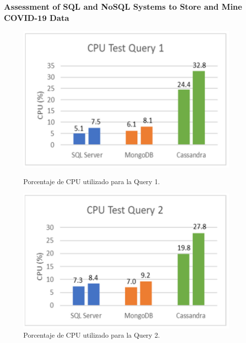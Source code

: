 \begin{frame}
    \frametitle{Assessment of SQL and NoSQL Systems to Store and Mine COVID-19 Data}

    \begin{figure}[H]
        \centering
        \begin{minipage}[b]{0.48\textwidth}
            \centering
            \includegraphics[width=\textwidth]{images/cov19-cpu-test-q1.png}
            \caption{Porcentaje de CPU utilizado para la Query 1.}
            \label{cov19-cputest-q1}
        \end{minipage}
        \hfill
        \begin{minipage}[b]{0.48\textwidth}
            \centering
            \includegraphics[width=\textwidth]{images/cov19-cpu-test-q2.png}
            \caption{Porcentaje de CPU utilizado para la Query 2.}
            \label{cov19-cputest-q2}
        \end{minipage}
    \end{figure}
\end{frame}

